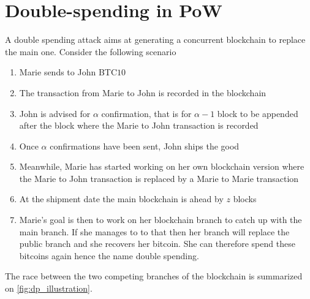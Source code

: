 \section{Double-spending in PoW}\label{sec:double_spending}
A double spending attack aims at generating a concurrent blockchain to replace the main one. Consider the following scenario
\begin{enumerate}
	\item Marie sends to John BTC$10$
	\item The transaction from Marie to John is recorded in the blockchain
	\item John is advised for $\alpha$ confirmation, that is for $\alpha-1$ block to be appended after the block where the Marie to John transaction is recorded
	\item Once $\alpha$ confirmations have been sent, John ships the good
	\item Meanwhile, Marie has started working on her own blockchain version where the Marie to John transaction is replaced by a Marie to Marie transaction
	\item At the shipment date the main blockchain is ahead by $z$ blocks 
	\item Marie's goal is then to work on her blockchain branch to catch up with the main branch. If she manages to to that then her branch will replace the public branch and she recovers her bitcoin. She can therefore spend these bitcoins again hence the name double spending.
\end{enumerate}
The race between the two competing branches of the blockchain is summarized on \cref{fig:dp_illustration}.
